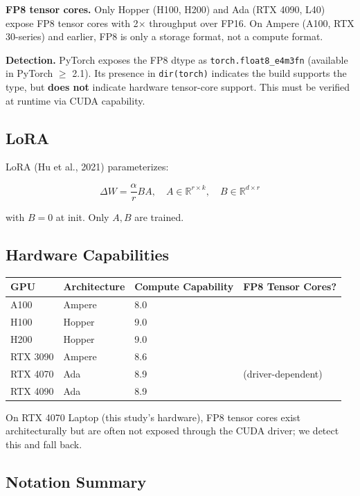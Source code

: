 \textbf{FP8 tensor cores.} Only Hopper (H100, H200) and Ada (RTX 4090, L40) expose 
FP8 tensor cores with 2$\times$ throughput over FP16. On Ampere (A100, RTX 30-series) 
and earlier, FP8 is only a storage format, not a compute format.

\textbf{Detection.} PyTorch exposes the FP8 dtype as \texttt{torch.float8\_e4m3fn} 
(available in PyTorch $\ge$ 2.1). Its presence in \texttt{dir(torch)} indicates the 
build supports the type, but \textbf{does not} indicate hardware tensor-core 
support. This must be verified at runtime via CUDA capability.

\subsection{LoRA}

LoRA (Hu et al., 2021) parameterizes:

\[
\Delta W = \frac{\alpha}{r} BA, \quad
A \in \mathbb{R}^{r \times k}, \quad
B \in \mathbb{R}^{d \times r}
\tag{3.4}
\]

with $B = 0$ at init. Only $A, B$ are trained.

\subsection{Hardware Capabilities}

\begin{table}[H]
\centering
\small
\begin{tabular}{llll}
\toprule
\textbf{GPU} & \textbf{Architecture} & \textbf{Compute Capability} & \textbf{FP8 Tensor Cores?} \\
\midrule
A100 & Ampere & 8.0 &  \\
H100 & Hopper & 9.0 &  \\
H200 & Hopper & 9.0 &  \\
RTX 3090 & Ampere & 8.6 &  \\
RTX 4070 & Ada & 8.9 & (driver-dependent) \\
RTX 4090 & Ada & 8.9 &  \\
\bottomrule
\end{tabular}
\end{table}

On RTX 4070 Laptop (this study's hardware), FP8 tensor cores exist 
architecturally but are often not exposed through the CUDA driver; we 
detect this and fall back.

\subsection{Notation Summary}

